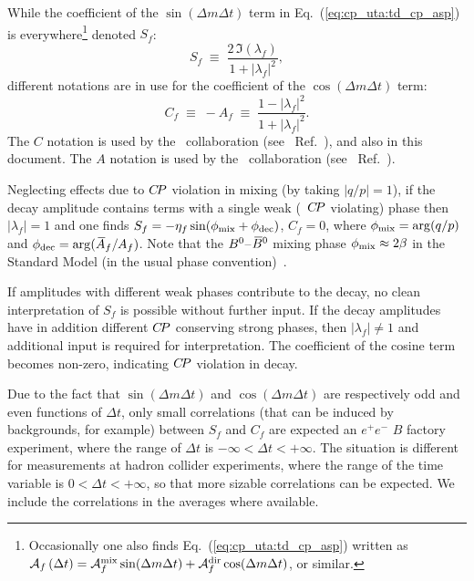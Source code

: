 While the coefficient of the $\sin(\Delta m \Delta t)$ term in 
Eq.~(\ref{eq:cp_uta:td_cp_asp}) is everywhere\footnote
{
  Occasionally one also finds Eq.~(\ref{eq:cp_uta:td_cp_asp}) written as
  ${\cal A}_{f} \left(\Delta t\right) = 
  {\cal A}^{\rm mix}_f \sin(\Delta m \Delta t) + {\cal A}^{\rm dir}_f \cos(\Delta m \Delta t)$,
  or similar.
} denoted $S_f$:
\begin{equation}
  \label{eq:cp_uta:s_def}
  S_f \;\equiv\; \frac{2\, \Im(\lambda_f)}{1 + \left|\lambda_f\right|^2},
\end{equation}
different notations are in use for the
coefficient of the $\cos(\Delta m \Delta t)$ term:
\begin{equation}
  \label{eq:cp_uta:c_def}
  C_f \;\equiv\; - A_f \;\equiv\; \frac{1 - \left|\lambda_f\right|^2}{1 + \left|\lambda_f\right|^2}.
\end{equation}
The $C$ notation is used by the \babar\  collaboration 
(see \eg\ Ref.~\cite{Aubert:2001sp}), 
and also in this document.
The $A$ notation is used by the \belle\ collaboration
(see \eg\ Ref.~\cite{Abe:2001xe}).

Neglecting effects due to $C\!P$ violation in mixing 
(by taking $|q/p| = 1$),
if the decay amplitude contains terms with 
a single weak (\ie\ $C\!P$ violating) phase
then $\left|\lambda_f\right| = 1$ and one finds
$S_f = -{\eta_f} \sin(\phi_{\rm mix} + \phi_{\rm dec})$, $C_f = 0$,
where $\phi_{\rm mix}=\arg(q/p)$ and $\phi_{\rm dec}=\arg(\kern 0.18em\overline{\kern -0.18em A}{}_f/A_f)$.
Note that the $B^0$--$\kern 0.18em\overline{\kern -0.18em B}{}^0$ mixing phase $\phi_{\rm mix}\approx2\beta$
in the Standard Model (in the usual phase convention)~\cite{Carter:1980tk,Bigi:1981qs}. 

If amplitudes with different weak phases contribute to the decay, 
no clean interpretation of $S_f$ is possible without further input. 
If the decay amplitudes have in addition different $C\!P$ conserving strong phases, then $\left| \lambda_f \right| \neq 1$ and additional input is required for interpretation.
The coefficient of the cosine term becomes non-zero,
indicating $C\!P$ violation in decay.

Due to the fact that $\sin(\Delta m \Delta t)$ and $\cos(\Delta m \Delta t)$ are respectively odd and even functions of $\Delta t$, only small correlations (that can be induced by backgrounds, for example) between $S_f$ and $C_f$ are expected an $e^+e^-$ $B$ factory experiment, where the range of $\Delta t$ is $-\infty < \Delta t < +\infty$.
The situation is different for measurements at hadron collider experiments, where the range of the time variable is $0 < \Delta t < +\infty$, so that more sizable correlations can be expected.  
We include the correlations in the averages where available.

